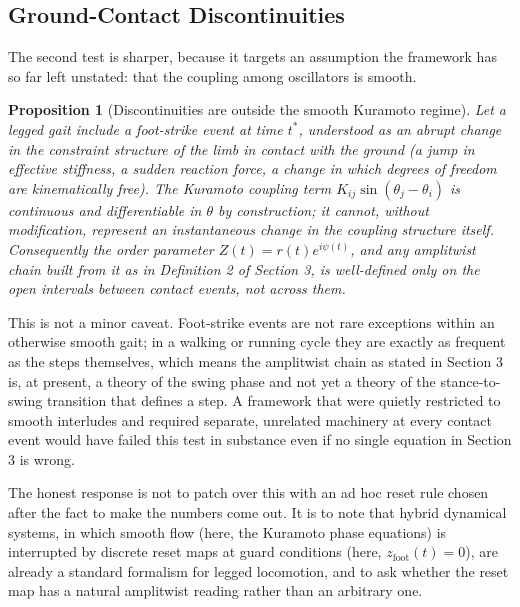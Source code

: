 \documentclass[12pt]{article}
\newtheorem{proposition}{Proposition}
\begin{document}
\subsection{Ground-Contact Discontinuities}

The second test is sharper, because it targets an assumption the framework has so far left unstated: that the coupling among oscillators is smooth.

\begin{proposition}[Discontinuities are outside the smooth Kuramoto regime]
Let a legged gait include a foot-strike event at time $t^*$, understood as an abrupt change in the constraint structure of the limb in contact with the ground (a jump in effective stiffness, a sudden reaction force, a change in which degrees of freedom are kinematically free). The Kuramoto coupling term $K_{ij}\sin(\theta_j - \theta_i)$ is continuous and differentiable in $\theta$ by construction; it cannot, without modification, represent an instantaneous change in the coupling structure itself. Consequently the order parameter $Z(t) = r(t)e^{i\psi(t)}$, and any amplitwist chain built from it as in Definition 2 of Section 3, is well-defined only on the open intervals between contact events, not across them.
\end{proposition}

This is not a minor caveat. Foot-strike events are not rare exceptions within an otherwise smooth gait; in a walking or running cycle they are exactly as frequent as the steps themselves, which means the amplitwist chain as stated in Section 3 is, at present, a theory of the swing phase and not yet a theory of the stance-to-swing transition that defines a step. A framework that were quietly restricted to smooth interludes and required separate, unrelated machinery at every contact event would have failed this test in substance even if no single equation in Section 3 is wrong.

The honest response is not to patch over this with an ad hoc reset rule chosen after the fact to make the numbers come out. It is to note that hybrid dynamical systems, in which smooth flow (here, the Kuramoto phase equations) is interrupted by discrete reset maps at guard conditions (here, $z_{\mathrm{foot}}(t) = 0$), are already a standard formalism for legged locomotion, and to ask whether the reset map has a natural amplitwist reading rather than an arbitrary one.
\end{document}
